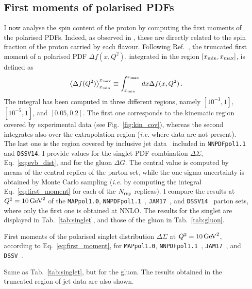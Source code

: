 \subsection{First moments of polarised PDFs}
I now analyse the spin content of the proton by computing the first moments of the polarised PDFs. Indeed, as observed in , these are directly related to the spin fraction of the proton carried by each flavour. Following Ref.~\cite{Nocera:2014gqa}, the truncated first moment of a polarised PDF $\Delta f (x,Q^2)$, integrated in the region $[x_{\textrm{min}}, x_{\textrm{max}}]$, is defined as
\begin{equation}
  \left< \Delta f (Q^2) \right>^{x_{\textrm{max}}}_{x_{\textrm{min}}} \equiv \int^{x_{\textrm{max}}}_{x_{\textrm{min}}} \, dx \Delta f (x,Q^2) \,.
  \label{eq:first_moment}
\end{equation}
The integral has been computed in three different regions, namely $[10^{-3},1]$, $[10^{-5},1]$, and $[0.05, 0.2]$. The first one corresponds to the kinematic region covered by experimental data (see Fig.~\ref{fig:kin_cov}), whereas the second integrates also over the extrapolation region (\textit{i.e.} where data are not present). The last one is the region covered by inclusive jet data~\cite{Nocera:2014gqa} included in \texttt{NNPDFpol1.1} and \texttt{DSSV14}. I provide values for the singlet PDF combination $\Delta \Sigma$, Eq.~\eqref{eq:evb_dist}, and for the gluon $\Delta G$. The central value is computed by means of the central replica of the parton set, while the one-sigma uncertainty is obtained by Monte Carlo sampling (\textit{i.e.} by computing the integral Eq.~\eqref{eq:first_moment} for each of the $N_{\textrm{rep}}$ replicas). I compare the results at $Q^2 = 10 \, \textrm{GeV}^2$ of the \texttt{MAPpol1.0}, \texttt{NNPDFpol1.1}~\cite{Nocera:2014gqa}, \texttt{JAM17}~\cite{Ethier:2017zbq}, and \texttt{DSSV14}~\cite{DeFlorian:2019xxt} parton sets, where only the first one is obtained at NNLO. The results for the singlet are displayed in Tab.~\ref{tab:singlet}, and those of the gluon in Tab.~\ref{tab:gluon}.
\begin{table}[t]
  \centering 
  \small
  
  \caption{
    \small
    First moments of the polarised singlet distribution $\Delta \Sigma$ at $Q^2 = 10 \, \textrm{GeV}^2$, according to Eq.~\eqref{eq:first_moment}, for \texttt{MAPpol1.0}, \texttt{NNPDFpol1.1}~\cite{Nocera:2014gqa}, \texttt{JAM17}~\cite{Ethier:2017zbq}, and \texttt{DSSV}~\cite{DeFlorian:2019xxt}.
  \label{tab:singlet}}
\end{table}
\begin{table}[t]
  \centering 
  \small
  
  \caption{
    \small
    Same as Tab.~\ref{tab:singlet}, but for the gluon. The results obtained in the truncated region of jet data are also shown.
  \label{tab:gluon}}
\end{table}

